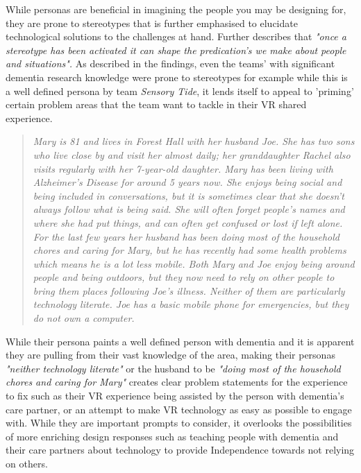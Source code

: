 While personas are beneficial in imagining the people you may be designing for, they are prone to stereotypes that is further emphasised to elucidate technological solutions to the challenges at hand. Further \cite{turner2011stereotyping} describes that \textit{"once a stereotype has been activated it can shape the predication's we make about people and situations".} As described in the findings, even the teams' with significant dementia research knowledge were prone to stereotypes for example while this is a well defined persona by team \textit{Sensory Tide}, it lends itself to appeal to 'priming' certain problem areas that the team want to tackle in their VR shared experience.
\begin{quote}
\textit{Mary is 81 and lives in Forest Hall with her husband Joe. She has two sons who live close by and visit her almost daily; her granddaughter Rachel also visits regularly with her 7-year-old daughter. Mary has been living with Alzheimer’s Disease for around 5 years now. She enjoys being social and being included in conversations, but it is sometimes clear that she doesn’t always follow what is being said. She will often forget people’s names and where she had put things, and can often get confused or lost if left alone. For the last few years her husband has been doing most of the household chores and caring for Mary, but he has recently had some health problems which means he is a lot less mobile. Both Mary and Joe enjoy being around people and being outdoors, but they now need to rely on other people to bring them places following Joe’s illness. Neither of them are particularly technology literate. Joe has a basic mobile phone for emergencies, but they do not own a computer. }
\end{quote}

While their persona paints a well defined person with dementia and it is apparent they are pulling from their vast knowledge of the area, making their personas \textit{"neither technology literate"} or the husband to be \textit{"doing most of the household chores and caring for Mary"} creates clear problem statements for the experience to fix such as their VR experience being assisted by the person with dementia's care partner, or an attempt to make VR technology as easy as possible to engage with. While they are important prompts to consider, it overlooks the possibilities of more enriching design responses such as teaching people with dementia and their care partners about technology to provide Independence towards not relying on others. 

